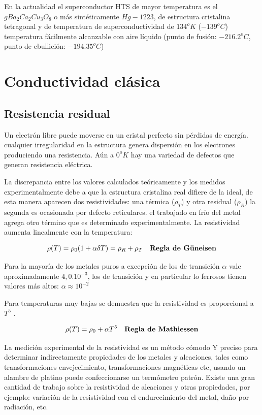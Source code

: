 En la actualidad el superconductor HTS de mayor temperatura es el ${gBa_{2}Ca_{2}Cu_{3}O_{8}}$ o más sintéticamente $Hg-1223$, de estructura cristalina tetragonal y de temperatura de superconductividad de $134^{o}K$ ($-139^{o}C$) temperatura fácilmente alcanzable con aire líquido (punto de fusión: $-216.2^{o}C$, punto de ebullición: $-194.35^{o}C$)


\section{Conductividad clásica}
\label{sec:pruebasHW}

\subsection{Resistencia residual} 

Un electrón libre puede moverse en un cristal perfecto sin pérdidas de energía. cualquier irregularidad en la estructura genera dispersión en los electrones produciendo una resistencia. Aún a $0^{o}K$ hay una variedad de defectos que generan resistencia eléctrica.

La discrepancia entre los valores calculados teóricamente y los medidos experimentalmente debe a que la estructura cristalina real difiere de la ideal, de esta manera aparecen dos resistividades: una térmica ($\rho_{T}$) y otra residual ($\rho_{R}$) la segunda es ocasionada por defecto reticulares. el trabajado en frío del metal agrega otro término que es determinado experimentalmente. La resistividad aumenta linealmente con la temperatura:


\begin{equation}
\rho(T)= \rho_{0}(1+\alpha \delta T) = \rho_{R} + \rho_{T} \quad \text{\textbf{Regla de G\"uneisen}}  
\end{equation}

Para la mayoría de los metales puros a excepción de los de transición $\alpha$ vale aproximadamente $4,0.10^{-3}$, los de transición y en particular lo ferrosos tienen valores más altos: $\alpha \approx 10^{-2}$

Para temperaturas muy bajas se demuestra que la resistividad es proporcional a $T^{5}$ .

\begin{equation}
	\rho(T)= \rho_{0}+\alpha T^{5} \quad \text{\textbf{Regla de Mathiessen}}  
\end{equation}

La medición experimental de la resistividad es un método cómodo Y preciso para determinar indirectamente propiedades de los metales y aleaciones, tales como transformaciones envejecimiento, transformaciones magnéticas etc, usando un alambre de platino puede confeccionarse un termómetro patrón. Existe una gran cantidad de trabajo sobre la resistividad de aleaciones y otras propiedades, por ejemplo: variación de la resistividad con el endurecimiento del metal, daño por radiación, etc.

